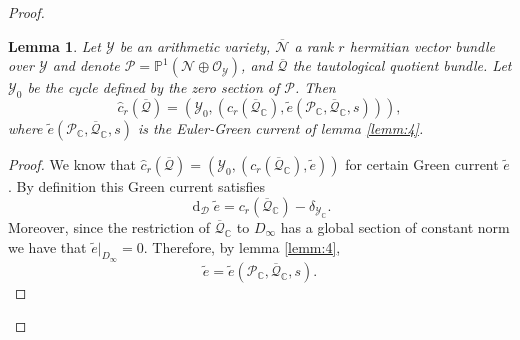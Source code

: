 \documentclass[10pt,twoside]{article}
\numberwithin{equation}{section}
\theoremstyle{plain}
\newtheorem{lemma}[equation]{Lemma}
\theoremstyle{definition}
\DeclareMathOperator{\dd}{d}
\begin{document}
\begin{proof}
    \begin{lemma}\label{lemm:5}
      Let $\mathcal{Y}$ be an arithmetic variety, 
      $\overline{\mathcal{N}}$ 
      a rank $r$ hermitian vector bundle over $\mathcal{Y}$ and denote 
      $\mathcal{P}=\mathbb{P}^{1}(\mathcal{N}\oplus
      \mathcal{O}_{\mathcal{Y}})$, and $\overline{\mathcal{Q}}$ the
      tautological quotient bundle. Let $\mathcal{Y}_{0}$ be the cycle
      defined by the zero
      section of $\mathcal{P}$. Then
      \begin{equation}
        \label{eq:95}
        \widehat{c}_{r}(\overline {\mathcal{Q}})=(\mathcal{Y}_{0},
        (c_{r}(\overline {\mathcal{Q}}_{\mathbb{C}}),\widetilde
        e(\mathcal{P}_{\mathbb{C}},\overline
        {\mathcal{Q}}_{\mathbb{C}},s))), 
      \end{equation}
      where $\widetilde e(\mathcal{P}_{\mathbb{C}},\overline
        {\mathcal{Q}}_{\mathbb{C}},s)$ is the Euler-Green current of
        lemma \ref{lemm:4}.
    \end{lemma}    
    \begin{proof}
      We know that
      $\widehat{c}_{r}(\overline {\mathcal{Q}})=(\mathcal{Y}_{0},
        (c_{r}(\overline {\mathcal{Q}}_{\mathbb{C}}),\widetilde
        e))$ for certain Green current $\widetilde e$. By definition
        this Green current satisfies
        \begin{displaymath}
          \dd_{\mathcal{D}}\widetilde e=c_{r}(\overline
          {\mathcal{Q}}_{\mathbb{C}}) -\delta _{\mathcal{Y}_{\mathbb{C}}}.
        \end{displaymath}
        Moreover, since the restriction of  $\overline
        {\mathcal{Q}}_{\mathbb{C}}$ to $D_{\infty}$ has a global section
        of constant norm we have that $\widetilde
        e|_{D_{\infty}}=0$. Therefore, by lemma \ref{lemm:4},  
        $$\widetilde e=\widetilde e(\mathcal{P}_{\mathbb{C}},\overline
        {\mathcal{Q}}_{\mathbb{C}},s).$$
    \end{proof}


\end{proof}
\end{document}

